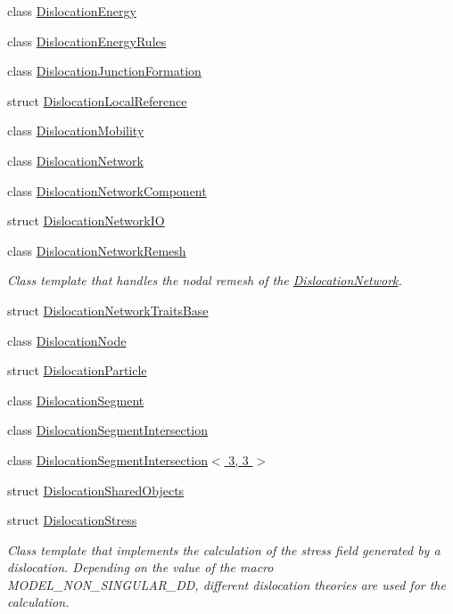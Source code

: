 \begin{DoxyCompactItemize}
class \hyperlink{classmodel_1_1_dislocation_energy}{Dislocation\+Energy}
\item 
class \hyperlink{classmodel_1_1_dislocation_energy_rules}{Dislocation\+Energy\+Rules}
\item 
class \hyperlink{classmodel_1_1_dislocation_junction_formation}{Dislocation\+Junction\+Formation}
\item 
struct \hyperlink{structmodel_1_1_dislocation_local_reference}{Dislocation\+Local\+Reference}
\item 
class \hyperlink{classmodel_1_1_dislocation_mobility}{Dislocation\+Mobility}
\item 
class \hyperlink{classmodel_1_1_dislocation_network}{Dislocation\+Network}
\item 
class \hyperlink{classmodel_1_1_dislocation_network_component}{Dislocation\+Network\+Component}
\item 
struct \hyperlink{structmodel_1_1_dislocation_network_i_o}{Dislocation\+Network\+I\+O}
\item 
class \hyperlink{classmodel_1_1_dislocation_network_remesh}{Dislocation\+Network\+Remesh}
\begin{DoxyCompactList}\small\item\em Class template that handles the nodal remesh of the \hyperlink{classmodel_1_1_dislocation_network}{Dislocation\+Network}. \end{DoxyCompactList}\item 
struct \hyperlink{structmodel_1_1_dislocation_network_traits_base}{Dislocation\+Network\+Traits\+Base}
\item 
class \hyperlink{classmodel_1_1_dislocation_node}{Dislocation\+Node}
\item 
struct \hyperlink{structmodel_1_1_dislocation_particle}{Dislocation\+Particle}
\item 
class \hyperlink{classmodel_1_1_dislocation_segment}{Dislocation\+Segment}
\item 
class \hyperlink{classmodel_1_1_dislocation_segment_intersection}{Dislocation\+Segment\+Intersection}
\item 
class \hyperlink{classmodel_1_1_dislocation_segment_intersection_3_013_00_013_01_4}{Dislocation\+Segment\+Intersection$<$ 3, 3 $>$}
\item 
struct \hyperlink{structmodel_1_1_dislocation_shared_objects}{Dislocation\+Shared\+Objects}
\item 
struct \hyperlink{structmodel_1_1_dislocation_stress}{Dislocation\+Stress}
\begin{DoxyCompactList}\small\item\em Class template that implements the calculation of the stress field generated by a dislocation. Depending on the value of the macro {\itshape M\+O\+D\+E\+L\+\_\+\+N\+O\+N\+\_\+\+S\+I\+N\+G\+U\+L\+A\+R\+\_\+\+D\+D}, different dislocation theories are used for the calculation. \end{DoxyCompactList}\item 

\end{DoxyCompactItemize}
